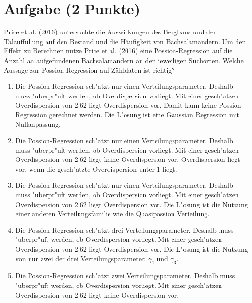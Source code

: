 \documentclass[a4paper, 10pt]{scrartcl}\usepackage[]{graphicx}\usepackage[]{xcolor}
\begin{document}
\section{Aufgabe \hfill (2 Punkte)}

Price et al. (2016) untersuchte die Auswirkungen des Bergbaus und der
Talauff{\"u}llung auf den Bestand und die H{\"a}ufigkeit von Bachsalamandern. Um
den Effekt zu Berechnen nutze Price et al. (2016) eine Possion-Regression
auf die Anzahl an aufgefundenen Bachsalamandern an den jeweiligen
Suchorten. Welche Aussage zur Possion-Regression auf Z{\"a}hldaten ist richtig?






\begin{enumerate}
\item [\textbf{A} \msquare] Die Possion-Regression sch{"a}tzt nur einen Verteilungsparameter. Deshalb muss {"u}berpr{"u}ft werden, ob Overdispersion vorliegt. Mit einer gesch{"a}tzen Overdispersion von 2.62 liegt Overdispersion vor. Damit kann keine Possion-Regression gerechnet werden. Die L{"o}sung ist eine Gaussian Regression mit Nullanpassung.
\item [\textbf{B} \msquare] Die Possion-Regression sch{"a}tzt nur einen Verteilungsparameter. Deshalb muss {"u}berpr{"u}ft werden, ob Overdispersion vorliegt. Mit einer gesch{"a}tzen Overdispersion von 2.62 liegt keine Overdispersion vor. Overdispersion liegt vor, wenn die gesch{"a}tzte Overdispersion unter 1 liegt.
\item [\textbf{C} \msquare] Die Possion-Regression sch{"a}tzt nur einen Verteilungsparameter. Deshalb muss {"u}berpr{"u}ft werden, ob Overdispersion vorliegt. Mit einer gesch{"a}tzen Overdispersion von 2.62 liegt Overdispersion vor. Die L{"o}sung ist die Nutzung einer anderen Verteilungsfamilie wie die Quasipossion Verteilung.
\item [\textbf{D} \msquare] Die Possion-Regression sch{"a}tzt drei Verteilungsparameter. Deshalb muss {"u}berpr{"u}ft werden, ob Overdispersion vorliegt. Mit einer gesch{"a}tzen Overdispersion von 2.62 liegt Overdispersion vor. Die L{"o}sung ist die Nutzung von nur zwei der drei Verteilungsparameter: $\gamma_1$ und $\gamma_3$.
\item [\textbf{E} \msquare] Die Possion-Regression sch{"a}tzt zwei Verteilungsparameter. Deshalb muss {"u}berpr{"u}ft werden, ob Overdispersion vorliegt. Mit einer gesch{"a}tzen Overdispersion von 2.62 liegt keine Overdispersion vor.
\end{enumerate}
\end{document}
